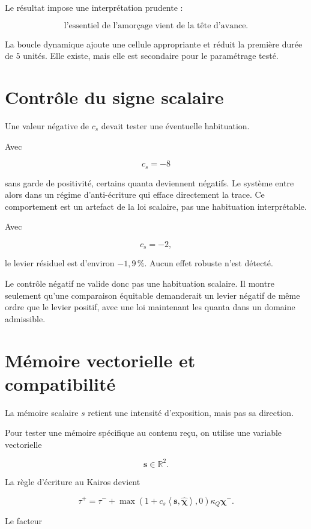 Le résultat impose une interprétation prudente :

\[
\boxed{
\text{l'essentiel de l'amorçage vient de la tête d'avance.}
}
\]

La boucle dynamique ajoute une cellule appropriante et réduit la
première durée de \(5\) unités. Elle existe, mais elle est secondaire
pour le paramétrage testé.

\section{Contrôle du signe scalaire}
\label{annexe-num-controle-signe-scalaire}

Une valeur négative de \(c_s\) devait tester une éventuelle
habituation.

Avec

\[
c_s=-8
\]

sans garde de positivité, certains quanta deviennent négatifs. Le
système entre alors dans un régime d'anti-écriture qui efface
directement la trace. Ce comportement est un artefact de la loi
scalaire, pas une habituation interprétable.

Avec

\[
c_s=-2,
\]

le levier résiduel est d'environ \(-1{,}9\,\%\). Aucun effet robuste
n'est détecté.

Le contrôle négatif ne valide donc pas une habituation scalaire. Il
montre seulement qu'une comparaison équitable demanderait un levier
négatif de même ordre que le levier positif, avec une loi maintenant
les quanta dans un domaine admissible.

\section{Mémoire vectorielle et compatibilité}
\label{annexe-num-memoire-vectorielle}

La mémoire scalaire \(s\) retient une intensité d'exposition, mais pas
sa direction.

Pour tester une mémoire spécifique au contenu reçu, on utilise une
variable vectorielle

\[
\boldsymbol s\in\mathbb R^2.
\]

La règle d'écriture au Kairos devient

\[
\boxed{
\tau^+
=
\tau^-
+
\max\left(
1+c_s\left\langle
\boldsymbol s,
\widehat{\boldsymbol\chi}
\right\rangle,
0
\right)
\kappa_Q\boldsymbol\chi^-.
}
\]

Le facteur

